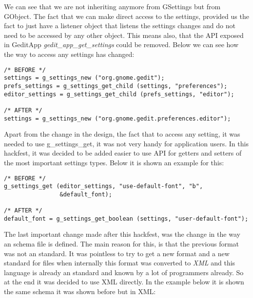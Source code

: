 
We can see that we are not inheriting anymore from GSettings but from GObject. The fact that we can make direct access to the settings, provided us the fact to just have a listener object that listens the settings changes and do not need to be accessed by any other object. This means also, that the API exposed in GeditApp \emph{gedit\_app\_get\_settings} could be removed. Below we can see how the way to access any settings has changed:

\begin{lstlisting}[style=GObject]
/* BEFORE */
settings = g_settings_new ("org.gnome.gedit");
prefs_settings = g_settings_get_child (settings, "preferences");
editor_settings = g_settings_get_child (prefs_settings, "editor");

/* AFTER */
settings = g_settings_new ("org.gnome.gedit.preferences.editor");
\end{lstlisting}

Apart from the change in the design, the fact that to access any setting, it was needed to use g\_settings\_get, it was not very handy for application users. In this hackfest, it was decided to be added easier to use API for getters and setters of the most important settings types. Below it is shown an example for this:

\begin{lstlisting}[style=GObject]
/* BEFORE */
g_settings_get (editor_settings, "use-default-font", "b",
                &default_font);

/* AFTER */
default_font = g_settings_get_boolean (settings, "user-default-font");
\end{lstlisting}

The last important change made after this hackfest, was the change in the way an schema file is defined. The main reason for this, is that the previous format was not an standard. It was pointless to try to get a new format and a new standard for files when internally this format was converted to \emph{XML} and this language is already an standard and known by a lot of programmers already. So at the end it was decided to use XML directly. In the example below it is shown the same schema it was shown before but in XML:

